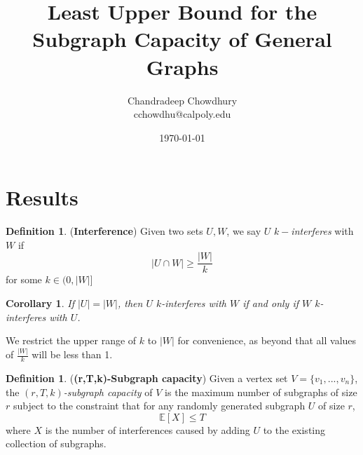 \documentclass[10pt]{extarticle}
\title{\textbf{Least Upper Bound for the Subgraph Capacity of General Graphs}}
\author{Chandradeep Chowdhury \\ cchowdhu@calpoly.edu}
\date{\today}
\newcommand{\E}{\mathbb{E}}
\newtheorem{corollary}[theorem]{Corollary}
\theoremstyle{definition}
\newtheorem{definition}[theorem]{Definition}
\begin{document}

\section{Results}

\begin{definition}
    (\textbf{Interference}) Given two sets $U, W$, we say $U$ $k-$\textit{interferes} with $W$ if 
    \begin{equation}
        |U \cap W| \ge  \frac{|W|}{k}
    \end{equation}
    for some $k \in (0,|W|]$
\end{definition}

\begin{corollary}
    If $|U| = |W|$, then $U$ $k$-interferes with $W$ if and only if $W$ $k$-interferes with $U$.
\end{corollary}

We restrict the upper range of $k$ to $|W|$ for convenience, as beyond that all values of $\frac{|W|}{k}$ will be less than 1.

\begin{definition} (\textbf{(r,T,k)-Subgraph capacity}) Given a vertex set $V = \{v_1,...,v_n\}$, the \textit{$(r,T,k)$-subgraph capacity} of $V$ is the maximum number of subgraphs of size $r$ subject to the constraint that for any randomly generated subgraph $U$ of size $r$, 
\begin{equation}
    \E[X] \le T
\end{equation}
where $X$ is the number of interferences caused by adding $U$ to the existing collection of subgraphs. 
\end{definition}
\end{document}
